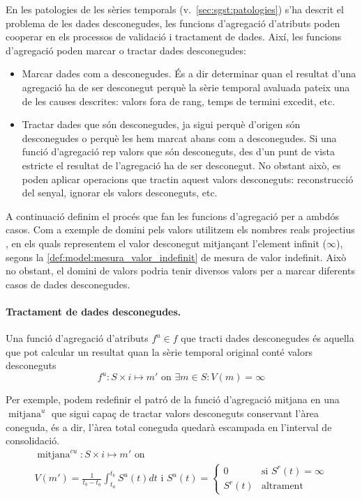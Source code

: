 En les patologies de les sèries temporals
(v.~\autoref{sec:sgst:patologies}) s'ha descrit el problema de les
dades desconegudes, les funcions d'agregació d'atributs poden cooperar
en els processos de validació i tractament de dades. Així, les
funcions d'agregació poden marcar o tractar dades desconegudes:
\begin{itemize}
\item Marcar dades com a desconegudes. És a dir determinar quan el
  resultat d'una agregació ha de ser desconegut perquè la sèrie
  temporal avaluada pateix una de les causes descrites: valors fora de
  rang, temps de termini excedit, etc.

\item Tractar dades que són desconegudes, ja sigui perquè d'origen són
  desconegudes o perquè les hem marcat abans com a desconegudes.
  Si una funció d'agregació rep valors que són desconeguts, des d'un
  punt de vista estricte el resultat de l'agregació ha de ser
  desconegut. No obstant això, es poden aplicar operacions que tractin
  aquest valors desconeguts: reconstrucció del senyal, ignorar els
  valors desconeguts, etc.
\end{itemize}

 
A continuació definim el procés que fan les funcions d'agregació per a
ambdós casos. Com a exemple de domini pels valors utilitzem els
nombres reals projectius , en els quals representem
el valor desconegut mitjançant l'element infinit ($\infty$), segons la
\autoref{def:model:mesura_valor_indefinit} de mesura de valor
indefinit. Això no obstant, el domini de valors podria tenir diversos
valors per a marcar diferents casos de dades desconegudes.

\paragraph{Tractament de dades desconegudes.}
Una funció d'agregació d'atributs $f^u \in f$ que tracti dades
desconegudes és aquella que pot calcular un resultat quan la sèrie
temporal original conté valors desconeguts
\[
f^u: S \times i \mapsto m' \text{ on } \exists m \in S: V(m)=\infty
\]

Per exemple, podem redefinir el patró de la funció d'agregació mitjana
en una $\operatorname{mitjana}^{u}$ que sigui capaç de tractar valors
desconeguts conservant l'àrea coneguda, és a dir, l'àrea total
coneguda quedarà escampada en l'interval de consolidació.
\begin{gather*}
  \operatorname{mitjana}^{cu}: S \times i \mapsto m' \text{ on }\\
  V(m') = \frac{1}{t_b-t_a}\int_{t_a}^{t_b} S^u(t)dt \text{ i }
  S^u(t)=
  \begin{cases}
    0 &\text{si }  S^r(t)=\infty\\
    S^r(t) & \text{altrament }
  \end{cases}
\end{gather*}


